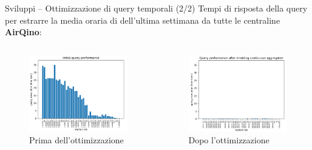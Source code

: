 \begin{frame}{Sviluppi – Ottimizzazione di query temporali (2/2)}
Tempi di risposta della query per estrarre la media oraria di  dell'ultima settimana da tutte le centraline \textbf{AirQino}:

\begin{columns}
\begin{column}{0.55\textwidth}
\begin{figure}[H]
\centering
\captionsetup{justification=centering}
\includegraphics[width=\textwidth]{images/query_prima}
\caption{Prima dell'ottimizzazione}
\end{figure}
\end{column}

\begin{column}{0.55\textwidth}
\begin{figure}[H]
\centering
\captionsetup{justification=centering}
\includegraphics[width=\textwidth]{images/query_dopo}
\caption{Dopo l'ottimizzazione}
\end{figure}
\end{column}
\end{columns}

\end{frame}


